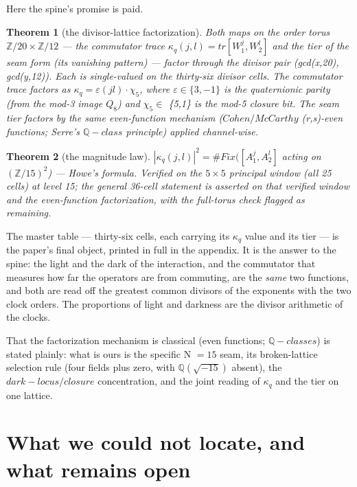 \documentclass[11pt]{article}
\theoremstyle{plain}
\newtheorem{theorem}{Theorem}[section]
\theoremstyle{definition}
\theoremstyle{remark}
\begin{document}
Here the spine's promise is paid.

\begin{theorem}[the divisor-lattice factorization]
Both maps on the order torus \(\mathbb{Z}/20 \times  \mathbb{Z}/12\) — the commutator trace \(\kappa _{q}(j,l) = tr[W_{1}^{j}, W_{2}^{l}]\) and the \emph{tier} of the seam form (its vanishing pattern) — factor through the divisor pair (gcd(x,20), gcd(y,12)). Each is single-valued on the thirty-six divisor cells. The commutator trace factors as \(\kappa _{q} = \varepsilon (jl)\cdot \chi _{5}\), where \(\varepsilon  \in  \{3,-1\}\) is the quaternionic parity (from the mod-3 image \(Q_{8}\)) and \(\chi _{5} \in \) \{5,1\} is the mod-5 closure bit. The seam tier factors by the same even-function mechanism (\(Cohen/McCarthy\) (r,s)-even functions; Serre's \(\mathbb{Q}-class\) principle) applied channel-wise.
\end{theorem}

\begin{theorem}[the magnitude law]
\(|\kappa _{q}(j,l)|^{2} = \#Fix([A_{1}^{j}, A_{2}^{l}]\) acting on \((\mathbb{Z}/15)^{2}\)) — Howe's formula. Verified on the \(5\times 5\) principal window (all 25 cells) at level 15; the general 36-cell statement is asserted on that verified window and the even-function factorization, with the full-torus check flagged as remaining.
\end{theorem}

The master table — thirty-six cells, each carrying its \(\kappa _{q}\) value and its tier — is the paper's final object, printed in full in the appendix. It is the answer to the spine: the light and the dark of the interaction, and the commutator that measures how far the operators are from commuting, are the \emph{same} two functions, and both are read off the greatest common divisors of the exponents with the two clock orders. The proportions of light and darkness are the divisor arithmetic of the clocks.

That the factorization mechanism is classical (even functions; \(\mathbb{Q}-classes\)) is stated plainly: what is ours is the specific N \(= 15\) seam, its broken-lattice selection rule (four fields plus zero, with \(\mathbb{Q}(\sqrt{-15})\) absent), the \(dark-locus/closure\) concentration, and the joint reading of \(\kappa _{q}\) and the tier on one lattice.

\section{What we could not locate, and what remains open}
\end{document}
